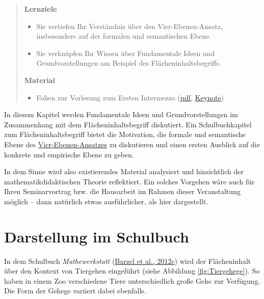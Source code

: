 \documentclass[
  ngerman,
]{scrbook}
\providecommand{\tightlist}{%
  \setlength{\itemsep}{0pt}\setlength{\parskip}{0pt}}
\theoremstyle{definition}
\theoremstyle{definition}
\theoremstyle{definition}
\theoremstyle{definition}
\theoremstyle{remark}
\begin{document}
\begin{quote}
\textbf{Lernziele}

\begin{itemize}
\tightlist
\item
  Sie vertiefen Ihr Verständnis über den Vier-Ebenen-Ansatz, insbesondere auf der formalen und semantischen Ebene.
\item
  Sie verknüpfen Ihr Wissen über Fundamentale Ideen und Grundvorstellungen am Beispiel des Flächeninhaltsbegriffs.
\end{itemize}

\textbf{Material}

\begin{itemize}
\tightlist
\item
  Folien zur Vorlesung zum Ersten Intermezzo (\href{files/Stoffdidaktik-WiSe2122-Kap5.pdf}{pdf}, \href{files/Stoffdidaktik-WiSe2122-Kap5.key}{Keynote})
\end{itemize}
\end{quote}

In diesem Kapitel werden Fundamentale Ideen und Grundvorstellungen im Zusammenhang mit dem Flächeninhaltsbegriff diskutiert. Ein Schulbuchkapitel zum Flächeninhaltsbegriff bietet die Motivation, die \textcolor{formalColor}{formale} und \textcolor{semanticColor}{semantische} Ebene des \protect\hyperlink{tab:fragen-ebenen}{Vier-Ebenen-Ansatzes} zu diskutieren und einen ersten Ausblick auf die \textcolor{concreteColor}{konkrete} und \textcolor{empiricColor}{empirische} Ebene zu geben.

In dem Sinne wird also existierendes Material analysiert und hinsichtlich der mathematikdidaktischen Theorie reflektiert. Ein solches Vorgehen wäre auch für Ihren Seminarvortrag bzw. die Hausarbeit im Rahmen dieser Veranstaltung möglich -- dann natürlich etwas ausführlicher, als hier dargestellt.

\hypertarget{darstellung-im-schulbuch}{%
\section{Darstellung im Schulbuch}\label{darstellung-im-schulbuch}}

In dem Schulbuch \emph{Mathewerkstatt} (\protect\hyperlink{ref-Barzel2012}{Barzel et al., 2012c}) wird der Flächeninhalt über den Kontext von Tiergehen eingeführt (siehe Abbildung \ref{fig:Tiergehege}). So haben in einem Zoo verschiedene Tiere unterschiedlich große Gehe zur Verfügung. Die Form der Gehege variiert dabei ebenfalls.
\end{document}
